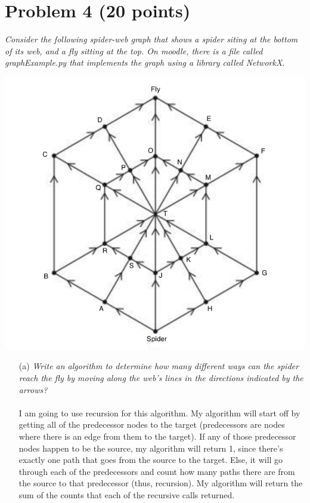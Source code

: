 \documentclass[12pt]{article}
\begin{document}
{\section*{{\selectfont Problem 4 (20 points)}}\vspace{-10mm}
\textsl{Consider the following spider-web graph that shows a spider siting at the bottom of its web, and a fly sitting at the top. On moodle, there is a file called graphExample.py that implements the graph using a library called NetworkX.}
\begin{center}
  \includegraphics[scale=0.4]{Web.png}
\end{center}
\begin{enumerate}
\item[(a)]\textsl{Write an algorithm to determine how many different ways can the spider reach the fly by moving along the web’s lines in the directions indicated by the arrows?}\\ \\
I am going to use recursion for this algorithm. My algorithm will start off by getting all of the predecessor nodes to the target (predecessors are nodes where there is an edge from them to the target). If any of those predecessor nodes happen to be the source, my algorithm will return 1, since there's exactly one path that goes from the source to the target. Else, it will go through each of the predecessors and count how many paths there are from the source to that predecessor (thus, recursion). My algorithm will return the sum of the counts that each of the recursive calls returned.

\end{enumerate}}
\end{document}
